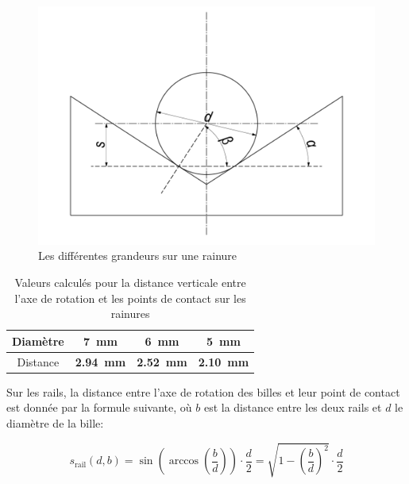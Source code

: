 \begin{figure}
    \centering
    \includegraphics[width=  \textwidth]{Graphics/Rails/E_1}
    \caption{Les différentes grandeurs sur une rainure}
    \label{fig:esq_rainures_1}
\end{figure}

\begin{table}[htbp]
    \centering
    \begin{tabular}{|c|c|c|c|}
        \hline
        Diamètre    & \SI{7}{\mm} & \SI{6}{\mm} & \SI{5}{\mm} \\
        \hline
        Distance    & \textbf{\SI{2.94}{\mm}} & \textbf{\SI{2.52}{\mm}} & \textbf{\SI{2.10}{\mm}} \\
        \hline
    \end{tabular}
    \caption{Valeurs calculés pour la distance verticale entre l'axe de rotation et les points de contact sur les rainures}
    \label{tab:distance_rainures}
\end{table}

Sur les rails, la distance entre l'axe de rotation des billes et leur point de contact est donnée par la formule suivante, où $b$ est la distance entre les deux rails et $d$ le diamètre de la bille:


\[s_{\text{rail}}(d,b) = \sin\left(\arccos\left(\frac{b}{d}\right)\right) \cdot \frac{d}{2} = \sqrt{1-\left(\frac{b}{d}\right)^{2}} \cdot \frac{d}{2}\]

